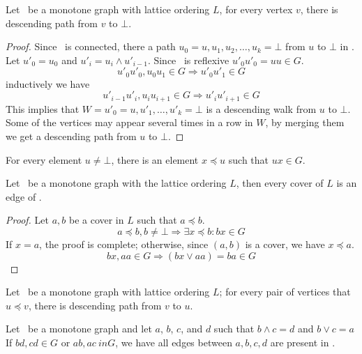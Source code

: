 \begin{lemma}
Let \mG\ be a monotone graph with lattice ordering \(L\),
for every vertex \(v\), there is descending path from
\(v\) to \(\bot\)\@.
\end{lemma}

\begin{proof}
Since \mG\ is connected, there a path \(u_0=u,u_1,u_2,\dotsc,u_k=\bot\) from \(u\) to 
\(\bot\) in \mG\@. Let \(u'_0=u_0\) and \(u'_i = u_i\wedge u'_{i-1}\)\@.
Since \mG\ is reflexive \(u'_0u'_0=uu \in G\)\@.
\[u'_0u'_0, u_0u_1 \in G \Rightarrow u'_0u'_1 \in G\]
inductively we have
\[u'_{i-1}u'_i, u_iu_{i+1} \in G \Rightarrow u'_iu'_{i+1} \in G\]
This implies that \(W=u'_0=u,u'_1,\dotsc,u'_k=\bot\) is a descending walk from 
\(u\) to \(\bot\)\@. Some of the vertices may appear several times in a row in \(W\),
by merging them we get a descending path from \(u\) to \(\bot\)\@.
\end{proof}

\begin{cor}
For every element \(u \neq \bot\),
there is an element \(x \preceq u\) such that \(ux \in G\)\@.
\end{cor}

\begin{lemma}
Let \mG\ be a monotone graph with the lattice ordering \(L\), then every cover
of \(L\) is an edge of \mG\@.
\end{lemma}

\begin{proof}
Let \(a,b\) be a cover in \(L\) such that \(a \preceq b\)\@.
\[a \preceq b, b\neq \bot \Rightarrow \exists x \preceq b: bx \in G\]
If \(x=a\), the proof is complete; otherwise, since \((a,b)\) is a cover, we have \(x\preceq a\).
\[bx,aa \in G \Rightarrow (bx \vee aa) = ba \in G\]\@
\end{proof}

\begin{cor}
Let \mG\ be a monotone graph with lattice ordering \(L\);
for every pair of vertices that \(u\preceq v\), there is descending path from
\(v\) to \(u\)\@. 
\end{cor}

\begin{lemma}
Let \mG\ be a monotone graph and let
\(a\), \(b\), \(c\), and \(d\) such that \(b \wedge c = d\) and \(b \vee c = a\)
If \(bd, cd \in G\) or \(ab, ac \ in G\), we have all edges between 
\(a, b, c, d\) are present in \mG\@.
\end{lemma}

